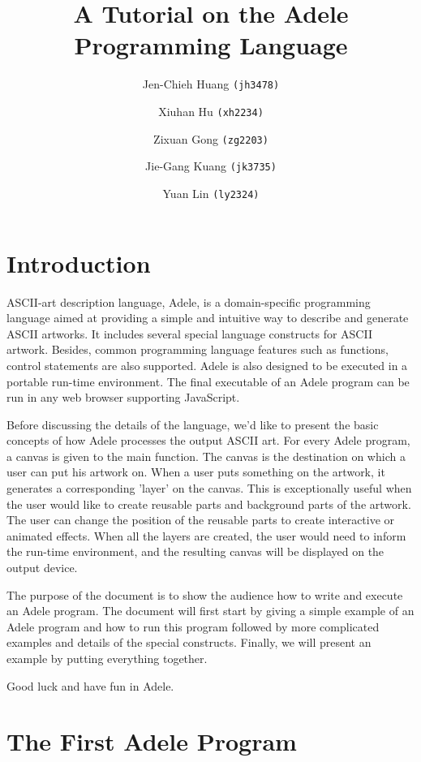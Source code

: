 \documentclass[11pt,letterpaper]{article}
\begin{document}
\title {A Tutorial on the Adele Programming Language}
\author {
	Jen-Chieh Huang \texttt{(jh3478)} \and Xiuhan Hu \texttt{(xh2234)} \and     
	Zixuan Gong \texttt{(zg2203)} \and Jie-Gang Kuang \texttt{(jk3735)} \and 
	Yuan Lin \texttt{(ly2324)}
}
\maketitle
\pagebreak
\tableofcontents
\pagebreak
\section {Introduction}

ASCII-art description language, Adele, is a domain-specific programming language aimed at providing a simple and intuitive way to describe and generate ASCII artworks. It includes several special language constructs for ASCII artwork. Besides, common programming language features such as functions, control statements are also supported. Adele is also designed to be executed in a portable run-time environment. The final executable of an Adele program can be run in any web browser supporting JavaScript. 

Before discussing the details of the language, we'd like to present the basic concepts of how Adele processes the output ASCII art. For every Adele program, a canvas is given to the main function. The canvas is the destination on which a user can put his artwork on. When a user puts something on the artwork, it generates a corresponding 'layer' on the canvas. This is exceptionally useful when the user would like to create reusable parts and background parts of the artwork. The user can change the position of the reusable parts to create interactive or animated effects. When all the layers are created, the user would need to inform the run-time environment, and the resulting canvas will be displayed on the output device.

The purpose of the document is to show the audience how to write and execute an Adele program. The document will first start by giving a simple example of an Adele program and how to run this program followed by more complicated examples and details of the special constructs. Finally, we will present an example by putting everything together.

Good luck and have fun in Adele.

\section {The First Adele Program}
\end{document}
